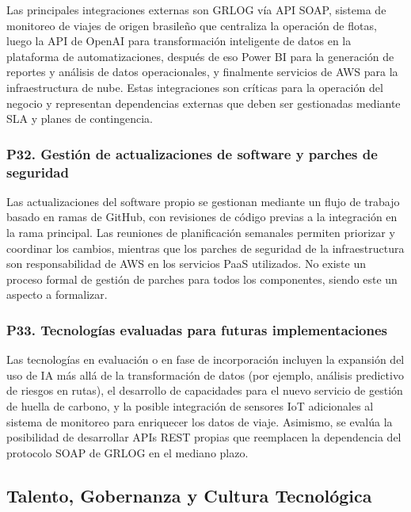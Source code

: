 \documentclass[12pt]{article}
\begin{document}
Las principales integraciones externas son GRLOG v\'ia API SOAP, sistema de
monitoreo de viajes de origen brasile\~no que centraliza la operaci\'on de flotas, luego la API de OpenAI para transformaci\'on inteligente de datos en la
plataforma de automatizaciones, después de eso Power BI para la generaci\'on de reportes y
an\'alisis de datos operacionales, y finalmente servicios de AWS para la infraestructura
de nube. Estas integraciones son cr\'iticas para la operaci\'on del negocio y representan
dependencias externas que deben ser gestionadas mediante SLA y planes de contingencia.

\subsubsection*{\textbf{P32. Gesti\'on de actualizaciones de software y parches de seguridad}}

Las actualizaciones del software propio se gestionan mediante un flujo de trabajo basado
en ramas de GitHub, con revisiones de c\'odigo previas a la integraci\'on en
la rama principal. Las reuniones de planificaci\'on semanales permiten priorizar y
coordinar los cambios, mientras que los parches de seguridad de la infraestructura son responsabilidad
de AWS en los servicios PaaS utilizados. No existe un proceso formal de gesti\'on de
parches para todos los componentes, siendo este un aspecto a formalizar.

\subsubsection*{\textbf{P33. Tecnolog\'ias evaluadas para futuras implementaciones}}

Las tecnolog\'ias en evaluaci\'on o en fase de incorporaci\'on incluyen la
expansi\'on del uso de IA m\'as all\'a de la transformaci\'on de datos (por ejemplo,
an\'alisis predictivo de riesgos en rutas), el desarrollo de capacidades para el nuevo
servicio de gesti\'on de huella de carbono, y la posible integraci\'on de
sensores IoT adicionales al sistema de monitoreo para enriquecer los datos de viaje.
Asimismo, se eval\'ua la posibilidad de desarrollar APIs REST propias que reemplacen
la dependencia del protocolo SOAP de GRLOG en el mediano plazo.

\subsection{Talento, Gobernanza y Cultura Tecnol\'ogica}
\end{document}
